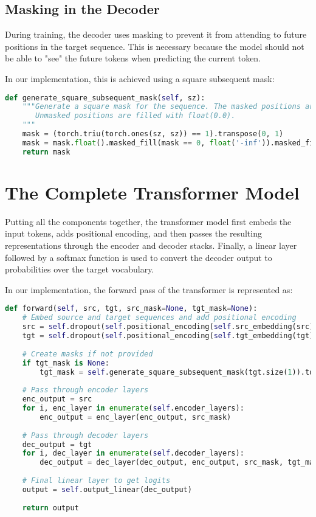 \documentclass{article}
\begin{document}
\subsection{Masking in the Decoder}

During training, the decoder uses masking to prevent it from attending to future positions in the target sequence. This is necessary because the model should not be able to "see" the future tokens when predicting the current token.

In our implementation, this is achieved using a square subsequent mask:

\begin{lstlisting}[language=Python, caption=Masking in the Decoder]
def generate_square_subsequent_mask(self, sz):
    """Generate a square mask for the sequence. The masked positions are filled with float('-inf').
       Unmasked positions are filled with float(0.0).
    """
    mask = (torch.triu(torch.ones(sz, sz)) == 1).transpose(0, 1)
    mask = mask.float().masked_fill(mask == 0, float('-inf')).masked_fill(mask == 1, float(0.0))
    return mask
\end{lstlisting}

\section{The Complete Transformer Model}

Putting all the components together, the transformer model first embeds the input tokens, adds positional encoding, and then passes the resulting representations through the encoder and decoder stacks. Finally, a linear layer followed by a softmax function is used to convert the decoder output to probabilities over the target vocabulary.

In our implementation, the forward pass of the transformer is represented as:

\begin{lstlisting}[language=Python, caption=Transformer Forward Pass]
def forward(self, src, tgt, src_mask=None, tgt_mask=None):
    # Embed source and target sequences and add positional encoding
    src = self.dropout(self.positional_encoding(self.src_embedding(src) * math.sqrt(self.d_model)))
    tgt = self.dropout(self.positional_encoding(self.tgt_embedding(tgt) * math.sqrt(self.d_model)))
    
    # Create masks if not provided
    if tgt_mask is None:
        tgt_mask = self.generate_square_subsequent_mask(tgt.size(1)).to(tgt.device)
        
    # Pass through encoder layers
    enc_output = src
    for i, enc_layer in enumerate(self.encoder_layers):
        enc_output = enc_layer(enc_output, src_mask)
        
    # Pass through decoder layers
    dec_output = tgt
    for i, dec_layer in enumerate(self.decoder_layers):
        dec_output = dec_layer(dec_output, enc_output, src_mask, tgt_mask)
        
    # Final linear layer to get logits
    output = self.output_linear(dec_output)
    
    return output
\end{lstlisting}
\end{document}
